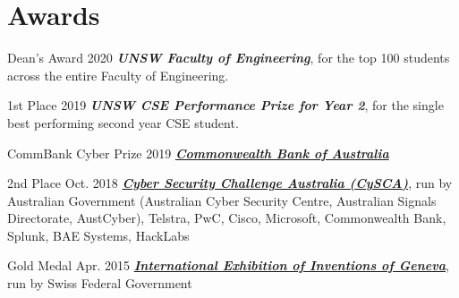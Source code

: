 \documentclass[hidelinks__VERSION__]{adamyi-cv}
\begin{document}
\section{Awards}

\begin{entrylist}


\entry
{Dean's Award}
{2020}
{\emph{\textbf{UNSW Faculty of Engineering}}, for the top 100 students across the entire Faculty of Engineering.}


\entry
{1st Place}
{2019}
{\emph{\textbf{UNSW CSE Performance Prize for Year 2}}, for the single best performing second year CSE student.}


\entry
{CommBank Cyber Prize}
{2019}
{\emph{\href{https://www.commbank.com.au/articles/newsroom/2020/08/tomorrow-cyber-security-talent.html}{\textbf{Commonwealth Bank of Australia}}}}


\entry
{2nd Place}
{Oct. 2018}
{\emph{\textbf{\href{https://www.cyberchallenge.com.au/}{Cyber Security Challenge Australia (CySCA)}}}, run by Australian Government (Australian Cyber Security Centre, Australian Signals Directorate, AustCyber), Telstra, PwC, Cisco, Microsoft, Commonwealth Bank, Splunk, BAE Systems, HackLabs}


\entry
{Gold Medal}
{Apr. 2015}
{\emph{\textbf{\href{https://inventions-geneva.ch/}{International Exhibition of Inventions of Geneva}}}, run by Swiss Federal Government}


\end{entrylist}

\end{document}

